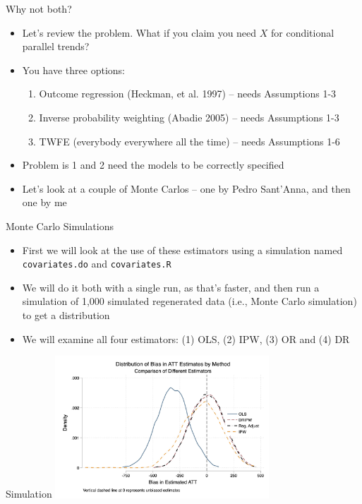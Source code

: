 \documentclass{beamer}
\begin{document}
\begin{frame}{Why not both?}

\begin{itemize}
\item Let's review the problem.  What if you claim you need $X$ for conditional parallel trends?
\item You have three options:
	\begin{enumerate}
	\item Outcome regression (Heckman, et al. 1997) -- needs Assumptions 1-3
	\item Inverse probability weighting (Abadie 2005) -- needs Assumptions 1-3
	\item TWFE (everybody everywhere all the time) -- needs Assumptions 1-6
	\end{enumerate}
\item Problem is 1 and 2 need the models to be correctly specified
\item Let's look at a couple of Monte Carlos -- one by Pedro Sant'Anna, and then one by me
\end{itemize}

\end{frame}



\begin{frame}{Monte Carlo Simulations}

\begin{itemize}

\item First we will look at the use of these estimators using a simulation named \texttt{covariates.do} and \texttt{covariates.R}

\item We will do it both with a single run, as that's faster, and then run a simulation of 1,000 simulated regenerated data (i.e., Monte Carlo simulation) to get a distribution

\item We will examine all four estimators: (1) OLS, (2) IPW, (3) OR and (4) DR

\end{itemize}

\end{frame}

\begin{frame}{Simulation}
    \centering
    \includegraphics[width=0.6\textwidth]{./lecture_includes/covariates.jpg}
\end{frame}
\end{document}
